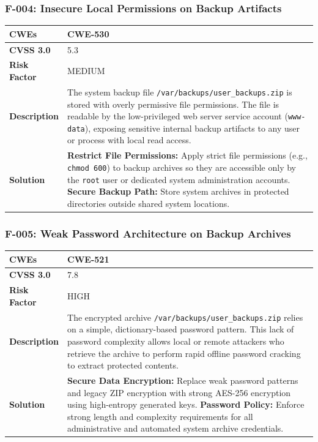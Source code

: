 \subsubsection{F-004: Insecure Local Permissions on Backup Artifacts}
\begin{tabular}{|p{2.8cm}|p{12.2cm}|}
\hline
\textbf{CWEs} & CWE-530 \\ \hline
\textbf{CVSS 3.0} & 5.3 \\ \hline
\textbf{Risk Factor} & MEDIUM \\ \hline
\textbf{Description} & The system backup file \texttt{/var/backups/user\_backups.zip} is stored with overly permissive file permissions. The file is readable by the low-privileged web server service account (\texttt{www-data}), exposing sensitive internal backup artifacts to any user or process with local read access. \\ \hline
\textbf{Solution} & \textbf{Restrict File Permissions:} Apply strict file permissions (e.g., \texttt{chmod 600}) to backup archives so they are accessible only by the \texttt{root} user or dedicated system administration accounts. \newline \textbf{Secure Backup Path:} Store system archives in protected directories outside shared system locations. \\ \hline
\end{tabular}

\subsubsection{F-005: Weak Password Architecture on Backup Archives}
\begin{tabular}{|p{2.8cm}|p{12.2cm}|}
\hline
\textbf{CWEs} & CWE-521 \\ \hline
\textbf{CVSS 3.0} & 7.8 \\ \hline
\textbf{Risk Factor} & HIGH \\ \hline
\textbf{Description} & The encrypted archive \texttt{/var/backups/user\_backups.zip} relies on a simple, dictionary-based password pattern. This lack of password complexity allows local or remote attackers who retrieve the archive to perform rapid offline password cracking to extract protected contents. \\ \hline
\textbf{Solution} & \textbf{Secure Data Encryption:} Replace weak password patterns and legacy ZIP encryption with strong AES-256 encryption using high-entropy generated keys. \newline \textbf{Password Policy:} Enforce strong length and complexity requirements for all administrative and automated system archive credentials. \\ \hline
\end{tabular}

